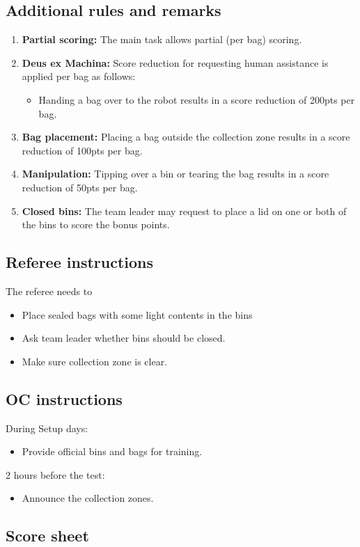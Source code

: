 \subsection*{Additional rules and remarks}
\begin{enumerate}[nosep]
	\item \textbf{Partial scoring:} The main task allows partial (per bag) scoring.
	\item \textbf{Deus ex Machina:} Score reduction for requesting human assistance is applied per bag as follows:
	\begin{itemize}[nosep]
		\item Handing a bag over to the robot results in a score reduction of 200pts per bag.
	\end{itemize}

	\item \textbf{Bag placement:} Placing a bag outside the collection zone results in a score reduction of 100pts per bag.
	\item \textbf{Manipulation:}  Tipping over a bin or tearing the bag results in a score reduction of 50pts per bag.
	\item \textbf{Closed bins:} The team leader may request to place a lid on one or both of the bins to score the bonus points.

\end{enumerate}

\subsection*{Referee instructions}

The referee needs to
\begin{itemize}
	\item Place sealed bags with some light contents in the bins
	\item Ask team leader whether bins should be closed.
	\item Make sure collection zone is clear.
\end{itemize}

\subsection*{OC instructions}
During Setup days:
\begin{itemize}
	\item Provide official bins and bags for training.
\end{itemize}

2 hours before the test:
\begin{itemize}
	\item Announce the collection zones.
\end{itemize}

\subsection*{Score sheet}



